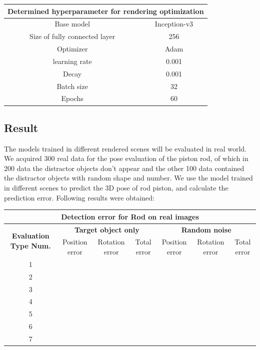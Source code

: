 \begin{table}[]
	\begin{tabular}{|c|c|}
		\hline
		\multicolumn{2}{|l|}{\textbf{Determined hyperparameter for rendering optimization}} \\ \hline
		Base model & Inception-v3 \\ \hline
		Size of fully connected layer & 256 \\ \hline
		Optimizer & Adam \\ \hline
		learning rate & 0.001 \\ \hline
		Decay & 0.001 \\ \hline
		Batch size & 32 \\ \hline
		Epochs & 60 \\ \hline
	\end{tabular}
\end{table}

\subsection{Result}
The models trained in different rendered scenes will be evaluated in real world. We acquired 300 real data for the pose evaluation of the piston rod, of which in 200 data the distractor objects don't appear and the other 100 data contained the distractor objects with random shape and number. We use the model trained in different scenes to predict the 3D pose of rod piston, and calculate the prediction error. Following results were obtained: 

\begin{table}[]
	\begin{tabular}{|c|c|c|c|c|c|c|}
		\hline
		\multicolumn{7}{|c|}{\textbf{Detection error for Rod on real images}} \\ \hline
		\multirow{2}{*}{\textbf{Evaluation Type Num.}} & \multicolumn{3}{c|}{\textbf{Target object only}} & \multicolumn{3}{c|}{\textbf{Random noise}} \\ \cline{2-7} 
		& Position error & Rotation error & Total error & Position error & Rotation error & Total error \\ \hline
		1 &  &  &  &  &  &  \\ \hline
		2 &  &  &  &  &  &  \\ \hline
		3 &  &  &  &  &  &  \\ \hline
		4 &  &  &  &  &  &  \\ \hline
		5 &  &  &  &  &  &  \\ \hline
		6 &  &  &  &  &  &  \\ \hline
		7 &  &  &  &  &  &  \\ \hline
	\end{tabular}
\end{table}

